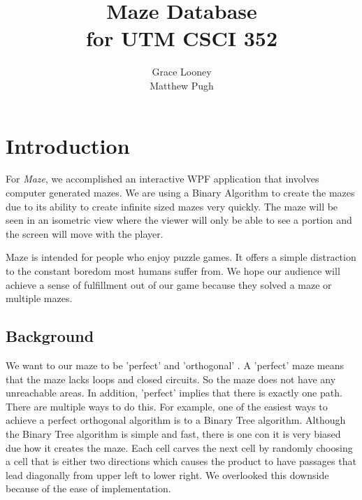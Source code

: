 \documentclass[10pt,conference,onecolumn,compsoc]{IEEEtran}
\begin{document}
\title{Maze Database\\ for UTM CSCI 352}
%
%


\author{Grace Looney\\Matthew Pugh%
}



\maketitle



\IEEEdisplaynontitleabstractindextext

\IEEEpeerreviewmaketitle



\section{Introduction}


For \textit{Maze}, we accomplished an interactive WPF application that involves computer generated mazes. We are using a Binary Algorithm to create the mazes due to its ability to create infinite sized mazes very quickly. The maze will be seen in an isometric view where the viewer will only be able to see a portion and the screen will move with the player. 

Maze is intended for people who enjoy puzzle games. It offers a simple distraction to the constant boredom most humans suffer from.  We hope our audience will achieve a sense of fulfillment out of our game because they solved a maze or multiple mazes. 

\subsection{Background}
We want to our maze to be 'perfect' and  'orthogonal' \cite{Pullen}. A 'perfect' maze means that the maze lacks loops and closed circuits. So the maze does not have any unreachable areas. In addition, 'perfect' implies that there is exactly one path. There are multiple ways to do this. For example, one of the easiest ways to achieve a perfect orthogonal algorithm is to a Binary Tree algorithm.  Although the Binary Tree algorithm is simple and fast, there is one con it is very biased due how it  creates the maze. Each cell carves the next cell by randomly choosing a cell that is either two directions which causes the product to have passages that lead diagonally from upper left to lower right. We overlooked this downside because of the ease of implementation.
\end{document}

